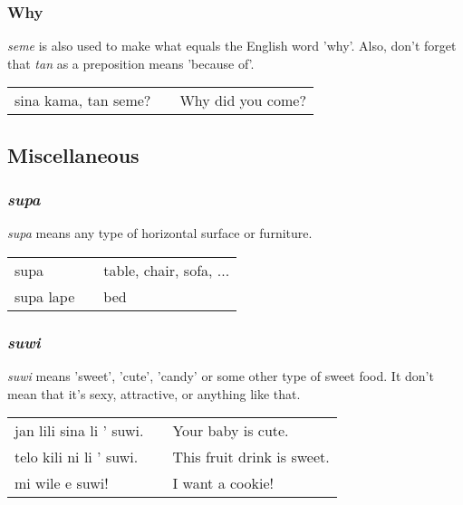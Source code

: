 \subsubsection*{Why}
%
\textit{seme} is also used to make what equals the English word 'why'. 
Also, don't forget that \textit{tan} as a preposition means 'because of'.

\begin{supertabular}{p{5,5cm}|ll}
sina kama, tan seme? && Why did you come? \\
\end{supertabular} 

%
\subsection*{Miscellaneous}
%
\subsubsection*{\textit{supa}}
%
\textit{supa} means any type of horizontal surface or furniture. 

\begin{supertabular}{p{5,5cm}|ll}
supa  && table, chair, sofa, ...  \\
supa lape &&  bed \\
\end{supertabular} 
%
\subsubsection*{\textit{suwi}}
%
\textit{suwi} means 'sweet', 'cute', 'candy' or some other type of sweet food. 
It don't mean that it's sexy, attractive, or anything like that. 

\begin{supertabular}{p{5,5cm}|ll}
jan lili sina li ' suwi. && Your baby is cute. \\
telo kili ni li ' suwi. && This fruit drink is sweet. \\
mi wile e suwi! && I want a cookie! \\
\end{supertabular} 
%
